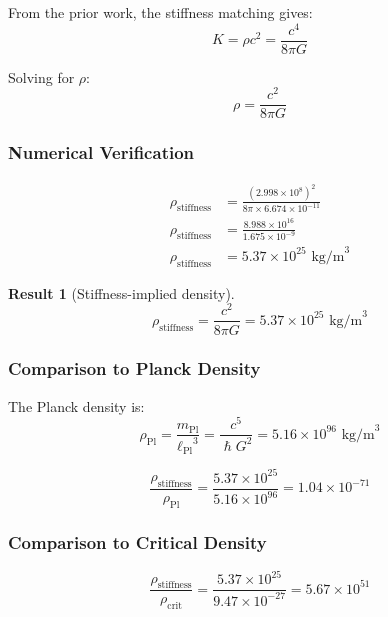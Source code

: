 \documentclass[11pt,a4paper]{article}
\newcommand{\ee}[1]{\times 10^{#1}}
\newcommand{\hbar}{\ensuremath{\hslash}}
\newcommand{\lPl}{\ensuremath{\ell_{\mathrm{Pl}}}}
\newcommand{\mPl}{\ensuremath{m_{\mathrm{Pl}}}}
\newcommand{\rhocrit}{\ensuremath{\rho_{\mathrm{crit}}}}
\newtheorem{result}{Result}
\begin{document}
From the prior work, the stiffness matching gives:
\begin{equation}
K = \rho c^2 = \frac{c^4}{8\pi G}
\end{equation}

Solving for $\rho$:
\begin{equation}
\rho = \frac{c^2}{8\pi G}
\end{equation}

\subsubsection{Numerical Verification}

\begin{align}
\rho_{\mathrm{stiffness}} &= \frac{(2.998 \ee{8})^2}{8\pi \times 6.674 \ee{-11}} \nonumber \\
\rho_{\mathrm{stiffness}} &= \frac{8.988 \ee{16}}{1.675 \ee{-9}} \nonumber \\
\rho_{\mathrm{stiffness}} &= 5.37 \ee{25} \text{ kg/m}^3
\end{align}

\begin{result}[Stiffness-implied density]
\begin{equation}
\boxed{\rho_{\mathrm{stiffness}} = \frac{c^2}{8\pi G} = 5.37 \times 10^{25} \text{ kg/m}^3}
\end{equation}
\end{result}

\subsubsection{Comparison to Planck Density}

The Planck density is:
\begin{equation}
\rho_{\mathrm{Pl}} = \frac{\mPl}{\lPl^3} = \frac{c^5}{\hbar G^2} = 5.16 \ee{96} \text{ kg/m}^3
\end{equation}

\begin{equation}
\frac{\rho_{\mathrm{stiffness}}}{\rho_{\mathrm{Pl}}} = \frac{5.37 \ee{25}}{5.16 \ee{96}} = 1.04 \ee{-71}
\end{equation}

\subsubsection{Comparison to Critical Density}

\begin{equation}
\frac{\rho_{\mathrm{stiffness}}}{\rhocrit} = \frac{5.37 \ee{25}}{9.47 \ee{-27}} = 5.67 \ee{51}
\end{equation}
\end{document}
